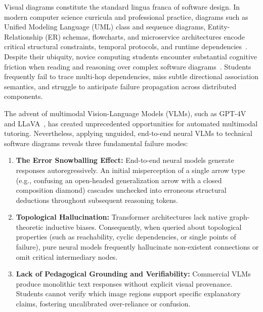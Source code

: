 \documentclass[runningheads]{llncs}
\begin{document}
Visual diagrams constitute the standard lingua franca of software design. In modern computer science curricula and professional practice, diagrams such as Unified Modeling Language (UML) class and sequence diagrams, Entity-Relationship (ER) schemas, flowcharts, and microservice architectures encode critical structural constraints, temporal protocols, and runtime dependencies~\cite{omg2015uml,garaccione2025educational}. Despite their ubiquity, novice computing students encounter substantial cognitive friction when reading and reasoning over complex software diagrams~\cite{ibanez2025evaluating}. Students frequently fail to trace multi-hop dependencies, miss subtle directional association semantics, and struggle to anticipate failure propagation across distributed components.

The advent of multimodal Vision-Language Models (VLMs), such as GPT-4V~\cite{achiam2023gpt4} and LLaVA~\cite{liu2023visual,liu2024llava16}, has created unprecedented opportunities for automated multimodal tutoring. Nevertheless, applying unguided, end-to-end neural VLMs to technical software diagrams reveals three fundamental failure modes:

\begin{enumerate}
    \item \textbf{The Error Snowballing Effect:} End-to-end neural models generate responses autoregressively. An initial misperception of a single arrow type (e.g., confusing an open-headed generalization arrow with a closed composition diamond) cascades unchecked into erroneous structural deductions throughout subsequent reasoning tokens.
    \item \textbf{Topological Hallucination:} Transformer architectures lack native graph-theoretic inductive biases. Consequently, when queried about topological properties (such as reachability, cyclic dependencies, or single points of failure), pure neural models frequently hallucinate non-existent connections or omit critical intermediary nodes.
    \item \textbf{Lack of Pedagogical Grounding and Verifiability:} Commercial VLMs produce monolithic text responses without explicit visual provenance. Students cannot verify which image regions support specific explanatory claims, fostering uncalibrated over-reliance or confusion.
\end{enumerate}
\end{document}
